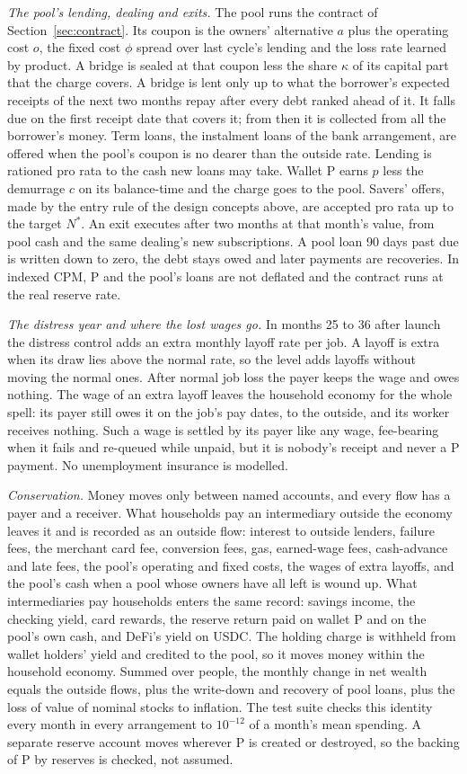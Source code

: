 \emph{The pool's lending, dealing and exits.} The pool runs the contract of Section~\ref{sec:contract}. Its coupon
is the owners' alternative $a$ plus the operating cost $o$, the fixed cost $\phi$ spread over last cycle's lending
and the loss rate learned by product. A bridge is sealed at that coupon less the share $\kappa$ of its capital part
that the charge covers. A bridge is lent only up to what the borrower's expected receipts of the next two months
repay after every debt ranked ahead of it. It falls due on the first receipt date that covers it; from then it is
collected from all the borrower's money. Term loans, the instalment loans of the bank arrangement, are offered when
the pool's coupon is no dearer than the
outside rate. Lending is rationed pro rata to the cash new loans may take. Wallet P earns $p$ less the demurrage $c$
on its balance-time and the charge goes to the pool. Savers' offers, made by the entry rule of the design concepts
above, are accepted pro rata up to the target $N^{*}$. An exit executes after two
months at that month's value, from pool cash and the same dealing's new subscriptions. A pool loan 90 days past due
is written down to zero, the debt stays owed and later payments are recoveries. In indexed CPM, P and the pool's
loans are not deflated and the contract runs at the real reserve rate.

\emph{The distress year and where the lost wages go.} In months 25 to 36 after launch the distress control adds an
extra monthly layoff rate per job. A layoff is extra when its draw lies above the normal rate, so the level adds
layoffs without moving the normal ones. After normal job loss the payer keeps the wage and owes nothing. The wage of
an extra layoff leaves the household economy for the whole spell: its payer still owes it on the job's pay dates, to
the outside, and its worker receives nothing. Such a wage is settled by its payer like any wage, fee-bearing when it
fails and re-queued while unpaid, but it is nobody's receipt and never a P payment. No unemployment insurance is
modelled.

\emph{Conservation.} Money moves only between named accounts, and every flow has a payer and a receiver. What
households pay an intermediary outside the economy leaves it and is recorded as an outside flow: interest to outside
lenders, failure fees, the merchant card fee, conversion fees, gas, earned-wage fees, cash-advance and late fees, the
pool's operating and fixed costs, the wages of extra layoffs, and the pool's cash when a pool whose owners have all
left is wound up. What intermediaries pay households enters the same record: savings income, the checking yield,
card rewards, the reserve return paid on wallet P and on the pool's own cash, and DeFi's yield on USDC. The holding
charge is withheld from wallet holders' yield and credited to the pool, so it moves money within the household
economy. Summed over people, the monthly change in net wealth equals the outside flows, plus the write-down and
recovery of pool loans, plus the loss of value of nominal stocks to inflation. The test suite checks this identity
every month in every arrangement to $10^{-12}$ of a month's mean spending. A separate reserve account moves wherever
P is created or destroyed, so the backing of P by reserves is checked, not assumed.

